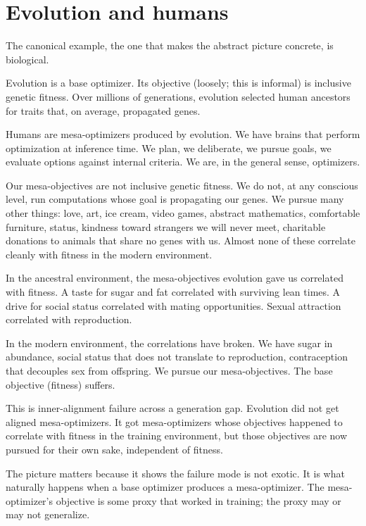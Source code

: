 \section*{Evolution and humans}

The canonical example, the one that makes the abstract picture concrete, is biological.

Evolution is a base optimizer. Its objective (loosely; this is informal) is inclusive genetic fitness. Over millions of generations, evolution selected human ancestors for traits that, on average, propagated genes.

Humans are mesa-optimizers produced by evolution. We have brains that perform optimization at inference time. We plan, we deliberate, we pursue goals, we evaluate options against internal criteria. We are, in the general sense, optimizers.

Our mesa-objectives are not inclusive genetic fitness. We do not, at any conscious level, run computations whose goal is propagating our genes. We pursue many other things: love, art, ice cream, video games, abstract mathematics, comfortable furniture, status, kindness toward strangers we will never meet, charitable donations to animals that share no genes with us. Almost none of these correlate cleanly with fitness in the modern environment.

In the ancestral environment, the mesa-objectives evolution gave us correlated with fitness. A taste for sugar and fat correlated with surviving lean times. A drive for social status correlated with mating opportunities. Sexual attraction correlated with reproduction.

In the modern environment, the correlations have broken. We have sugar in abundance, social status that does not translate to reproduction, contraception that decouples sex from offspring. We pursue our mesa-objectives. The base objective (fitness) suffers.

This is inner-alignment failure across a generation gap. Evolution did not get aligned mesa-optimizers. It got mesa-optimizers whose objectives happened to correlate with fitness in the training environment, but those objectives are now pursued for their own sake, independent of fitness.

The picture matters because it shows the failure mode is not exotic. It is what naturally happens when a base optimizer produces a mesa-optimizer. The mesa-optimizer's objective is some proxy that worked in training; the proxy may or may not generalize.

